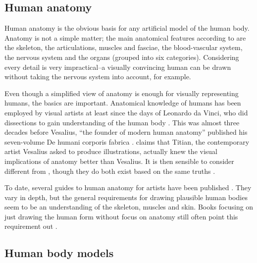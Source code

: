 \subsection{Human anatomy}
Human anatomy is the obvious basis for any artificial model of the human body. Anatomy is not a simple matter; the main anatomical features according to  \citep{pick1977gray} are the skeleton, the articulations, muscles and fasciae, the blood-vascular system, the nervous system and the organs (grouped into six categories). Considering every detail is very impractical--a visually convincing human can be drawn without taking the nervous system into account, for example.

Even though a simplified view of anatomy is enough for visually representing humans, the basics are important. Anatomical knowledge of humans has been employed by visual artists at least since the days of Leonardo da Vinci, who did dissections to gain understanding of the human body . This was almost three decades before Vesalius, ``the founder of modern human anatomy'' published his seven-volume De humani corporis fabrica \citep{vesalius1543}. \citet{hogarth2003} claims that Titian, the contemporary artist Vesalius asked to produce illustrations, actually knew the visual implications of anatomy better than Vesalius. It is then sensible to consider  different from , though they do both exist based on the same truths \citep{hogarth2003}.

To date, several guides to human anatomy for artists have been published \autocites{hogarth2003}{simblet2001}{goldfinger1991}. They vary in depth, but the general requirements for drawing plausible human bodies seem to be an understanding of the skeleton, muscles and skin. Books focusing on just drawing the human form without focus on anatomy still often point this requirement out \autocites{ediciones2004}{loomis1943figure}.

\citep{loomis1943figure}


\subsection{Human body models}


